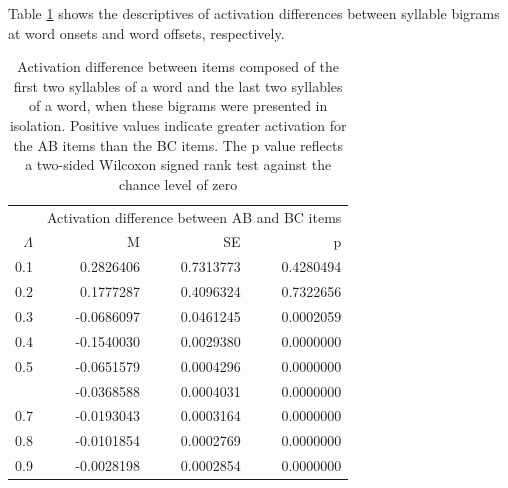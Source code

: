 \documentclass[
]{article}
\begin{document}
Table
\ref{tab:basic-experiment-global-print-difference-between-parts-of-word2}
shows the descriptives of activation differences between syllable
bigrams at word onsets and word offsets, respectively.

\begin{table}

\caption{\label{tab:basic-experiment-global-print-difference-between-parts-of-word2}Activation difference between items composed of the first two syllables of a word and the last two syllables of a word, when these bigrams were presented in isolation. Positive values indicate greater activation for the AB items than the BC items. The p value reflects a two-sided Wilcoxon signed rank test against the chance level of zero}
\centering
\begin{tabular}[t]{rrrr}
\toprule
\multicolumn{1}{c}{ } & \multicolumn{3}{c}{Activation difference between AB and BC items} \\
\cmidrule(l{3pt}r{3pt}){2-4}
$\Lambda$ & M & SE & p\\
\midrule
0.1 & 0.2826406 & 0.7313773 & 0.4280494\\
0.2 & 0.1777287 & 0.4096324 & 0.7322656\\
0.3 & -0.0686097 & 0.0461245 & 0.0002059\\
0.4 & -0.1540030 & 0.0029380 & 0.0000000\\
0.5 & -0.0651579 & 0.0004296 & 0.0000000\\
\addlinespace
0.6 & -0.0368588 & 0.0004031 & 0.0000000\\
0.7 & -0.0193043 & 0.0003164 & 0.0000000\\
0.8 & -0.0101854 & 0.0002769 & 0.0000000\\
0.9 & -0.0028198 & 0.0002854 & 0.0000000\\
\bottomrule
\end{tabular}
\end{table}

  
\end{document}
